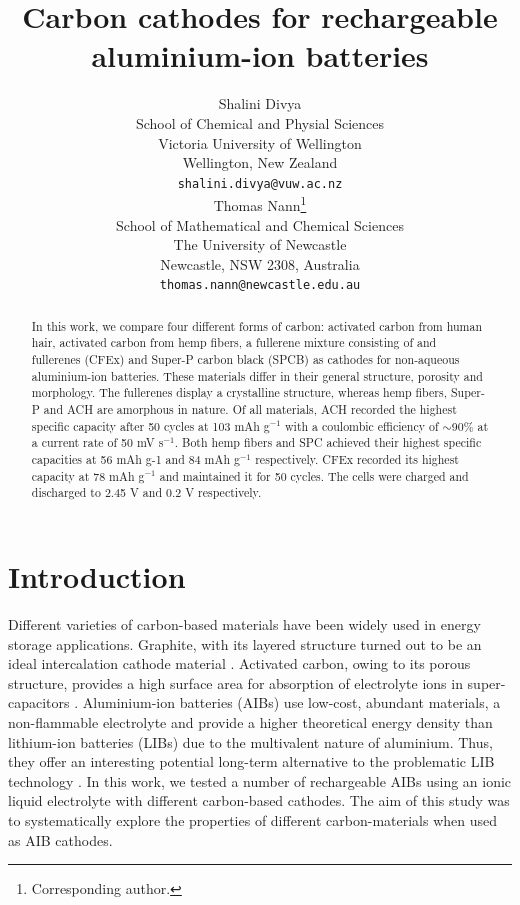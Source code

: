 \documentclass{article}
\title{Carbon cathodes for rechargeable aluminium-ion batteries}
\author{
  Shalini Divya\\
  School of Chemical and Physial Sciences\\
  Victoria University of Wellington\\
  Wellington, New Zealand\\
  \texttt{shalini.divya@vuw.ac.nz}\\
   \And
  Thomas Nann\thanks{Corresponding author.}\\
  School of Mathematical and Chemical Sciences\\
  The University of Newcastle\\
  Newcastle, NSW 2308, Australia\\
  \texttt{thomas.nann@newcastle.edu.au}\\
}
\begin{document}
\maketitle
\begin{abstract}
 In this work, we compare four different forms of carbon: activated carbon from human hair, activated carbon from hemp fibers, a fullerene mixture consisting of  and  fullerenes (CFEx) and Super-P carbon black (SPCB) as cathodes for non-aqueous aluminium-ion batteries. These materials differ in their general structure, porosity and morphology. The fullerenes display a crystalline structure, whereas hemp fibers, Super-P and ACH are amorphous in nature. Of all materials, ACH recorded the highest specific capacity after 50 cycles at 103 mAh g$^{-1}$ with a coulombic efficiency of $\sim$90\% at a current rate of 50 mV s$^{-1}$. Both hemp fibers and SPC achieved their highest specific capacities at 56 mAh g-1 and 84 mAh g$^{-1}$ respectively. CFEx recorded its highest capacity at 78 mAh g$^{-1}$ and maintained it for 50 cycles. The cells were charged and discharged to 2.45 V and 0.2 V respectively. 
 \end{abstract}
 

\section{Introduction}
Different varieties of carbon-based materials have been widely used in energy storage applications. Graphite, with its layered structure turned out to be an ideal intercalation cathode material \cite{ji_recent_2011, yoo_large_2008, lian_large_2010}. Activated carbon, owing to its porous structure, provides a high surface area for absorption of electrolyte ions in super-capacitors \cite{eliad_ion_2001, zhu_carbon-based_2011}. Aluminium-ion batteries (AIBs) use low-cost, abundant materials, a non-flammable electrolyte and provide a higher theoretical energy density than lithium-ion batteries (LIBs) due to the multivalent nature of aluminium. Thus, they offer an interesting potential long-term alternative to the problematic LIB technology \cite{ambroz_trends_2017-1}. In this work, we tested a number of rechargeable AIBs using an ionic liquid electrolyte with different carbon-based cathodes. The aim of this study was to systematically explore the properties of different carbon-materials when used as AIB cathodes.
\end{document}
